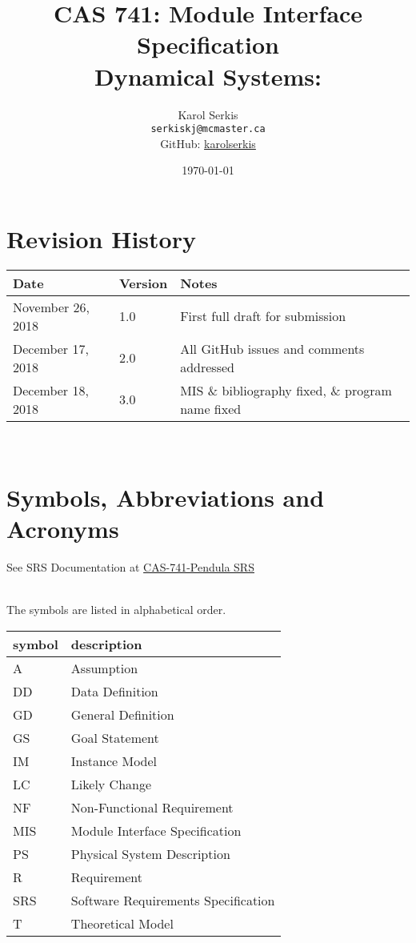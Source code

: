\documentclass[12pt, titlepage]{article}
\begin{document}
\title{CAS 741: Module Interface Specification\\[10pt]\Large Dynamical 
Systems: \progname}
\author{Karol Serkis\\\texttt{serkiskj@mcmaster.ca}\\GitHub:
\href{https://www.github.com/karolserkis}{karolserkis}}
\date{\today}

\maketitle


\section{Revision History}

\begin{tabularx}{\textwidth}{p{4cm}p{2cm}X}
\toprule {\bf Date} & {\bf Version} & {\bf Notes}\\
\midrule
November 26, 2018 & 1.0 &  First full draft for submission\\
December 17, 2018 & 2.0 & All GitHub issues and comments addressed \\
December 18, 2018 & 3.0 & MIS \& bibliography fixed, 
\& program name fixed \\
\bottomrule
\end{tabularx}

~\newpage

\section{Symbols, Abbreviations and Acronyms}

See SRS Documentation at 
\href{https://github.com/karolserkis/CAS-741-Pendula/blob/master/docs/SRS/SRS.pdf}
{CAS-741-Pendula SRS}

\\
The symbols are listed in alphabetical order.\\

\renewcommand{\arraystretch}{1.2}
\begin{tabular}{l l} 
  \toprule		
  \textbf{symbol} & \textbf{description}\\
  \midrule 
  A & Assumption\\
  DD & Data Definition\\
  GD & General Definition\\
  GS & Goal Statement\\
  IM & Instance Model\\
  LC & Likely Change\\
  NF & Non-Functional Requirement\\
  MIS & Module Interface Specification\\
  PS & Physical System Description\\
  R & Requirement\\
  SRS & Software Requirements Specification\\
  T & Theoretical Model\\
  \bottomrule
\end{tabular}\\
\end{document}

